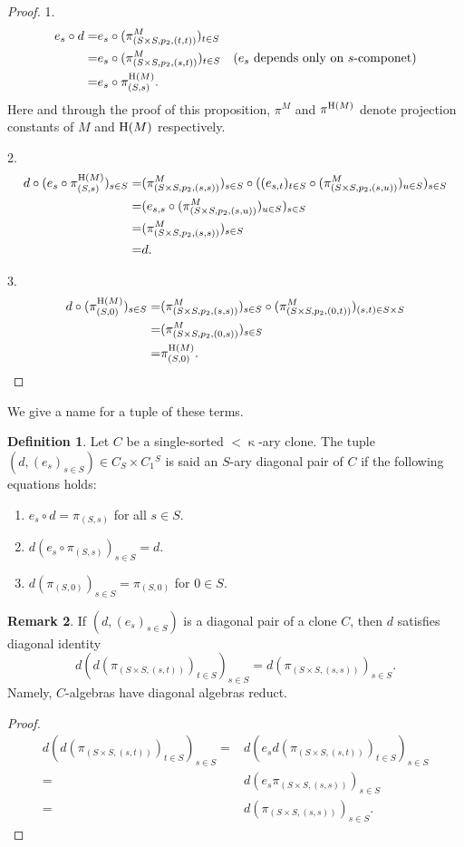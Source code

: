 \documentclass[a4paper,10pt]{article}
\theoremstyle{definition}
\newtheorem{df}{Definition}[section]
\newtheorem{rem}[df]{Remark}
\newcommand\mc{\mathclose}
\begin{document}
\begin{proof}
1. 
\begin{align*}
e_s\circ d
=&e_s\circ (\pi_{(S\times S,p_2,(t,t))}^M)_{t\in S}&\\
=&e_s\circ (\pi_{(S\times S,p_2,(s,t))}^M)_{t\in S}&(e_s\text{ depends only on }s\text{-componet})\\
=&e_s\circ \pi_{(S,s)}^{{\rm H}(M)}.&
\end{align*}
Here and through the proof of this proposition,
$\pi^M$ and $\pi^{{\rm H}(M)}$ denote projection constants
of $M$ and ${\rm H}(M)$ respectively.

2.
\begin{align*}
d\circ (e_s\circ \pi_{(S,s)}^{{\rm H}(M)})_{s\in S}
=& (\pi_{(S\times S,p_2,(s,s))}^M)_{s\in S}
 \circ ((e_{s,t})_{t\in S}\circ (\pi_{(S\times S,p_2,(s,u))}^M)_{u\in S})_{s\in S}\\
=& (e_{s,s}\circ (\pi_{(S\times S,p_2,(s,u))}^M)_{u\in S})_{s\in S}\\
=& (\pi_{(S\times S,p_2,(s,s))}^M)_{s\in S}\\
=& d.
\end{align*}

3.
\begin{align*}
d\circ (\pi_{(S,0)}^{{\rm H}(M)})_{s\in S}
=&(\pi_{(S\times S,p_2,(s,s))}^M)_{s\in S}
 \circ (\pi_{(S\times S,p_2,(0,t))}^M)_{(s,t)\in S\times S}\\
=& (\pi_{(S\times S,p_2,(0,s))}^M)_{s\in S}\\
=& \pi_{(S,0)}^{{\rm H}(M)}.
\end{align*}
\end{proof}

We give a name for a tuple of these terms.
\begin{df}\label{diagonal-pair}
Let $C$ be a single-sorted $<\mc\kappa$-ary clone.
The tuple $(d,(e_s)_{s\in S})\in C_S\times C_1{}^S$ is 
said an $S$-ary diagonal pair of $C$ if the following equations holds:
\begin{enumerate}
\item
$e_{s}\circ d=\pi_{(S,s)}$ for all $s\in S$.
\item
$d(e_s\circ \pi_{(S,s)})_{s\in S}=d$.
\item
$d(\pi_{(S,0)})_{s\in S}=\pi_{(S,0)}$ for $0\in S$.
\end{enumerate}
\end{df}

\begin{rem}
If $(d,(e_s)_{s\in S})$ is a diagonal pair of a clone $C$,
then $d$ satisfies diagonal identity
\[
d(d(\pi_{(S\times S,(s,t))})_{t\in S})_{s\in S}
=d(\pi_{(S\times S,(s,s))})_{s\in S}.
\]
Namely, $C$-algebras have diagonal algebras reduct.
\end{rem}
\begin{proof}
\begin{align*}
d(d(\pi_{(S\times S,(s,t))})_{t\in S})_{s\in S}
=&d(e_sd(\pi_{(S\times S,(s,t))})_{t\in S})_{s\in S}\\
=&d(e_s\pi_{(S\times S,(s,s))})_{s\in S}\\
=&d(\pi_{(S\times S,(s,s))})_{s\in S}.
\end{align*}
\end{proof}
\end{document}
